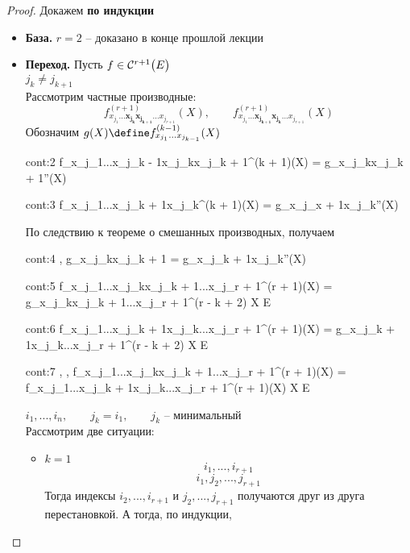 \begin{proof}
	Докажем \textbf{по индукции}
	\begin{itemize}
		\item \textbf{База.} $ r = 2 $ -- доказано в конце прошлой лекции
		\item \textbf{Переход.}
		Пусть $ f \in \Cont[r + 1]{E} $ \\
		$ j_k \ne j_{k + 1} $ \\
		Рассмотрим частные производные:
		$$ f_{x_{j_1}...\bm{x_{j_k}x_{j_{k + 1}}}...x_{j_{r + 1}}}^{(r + 1)}(X), \qquad f_{x_{j_1}...\bm{x_{j_{k + 1}}x_{j_k}}...x_{j_{r + 1}}}^{(r + 1)}(X) $$
		Обозначим $ g(X) \define f_{x_{j_1}...x_{j_{k - 1}}}^{(k - 1)}(X) $
		\begin{equ}{cont:2}
			f_{x_{j_1}...x_{j_{k - 1}}x_{j_k}x_{j_{k + 1}}}^{(k + 1)}(X) = g_{x_{j_k}x_{j_{k + 1}}}''(X)
		\end{equ}
		\begin{equ}{cont:3}
			f_{x_{j_1}...x_{j_{k + 1}}x_{j_k}}^{(k + 1)}(X) = g_{x_{j_{x + 1}}x_{j_k}}''(X)
		\end{equ}
		По следствию к теореме о смешанных производных, получаем
		\begin{equ}{cont:4}
			,  \implies  g_{x_{j_k}x_{j_{k + 1}}} = g_{x_{j_{k + 1}}x_{j_k}}''(X)
		\end{equ}
		\begin{equ}{cont:5}
			 \implies f_{x_{j_1}...x_{j_k}x_{j_{k + 1}}...x_{j_{r + 1}}}^{(r + 1)}(X) = g_{x_{j_k}x_{j_{k + 1}}...x_{j_{r + 1}}}^{(r - k + 2)} \quad \forall X \in E
		\end{equ}
		\begin{equ}{cont:6}
			 \implies f_{x_{j_1}...x_{j_{k + 1}}x_{j_k}...x_{j_{r + 1}}}^{(r + 1)}(X) = g_{x_{j_{k + 1}}x_{j_k}...x_{j_{r + 1}}}^{(r - k + 2)} \quad \forall X \in E
		\end{equ}
		\begin{equ}{cont:7}
			, ,  \implies f_{x_{j_1}...x_{j_k}x_{j_{k + 1}}...x_{j_{r + 1}}}^{(r + 1)}(X) = f_{x_{j_1}...x_{j_{k + 1}}x_{j_k}...x_{j_{r + 1}}}^{(r + 1)}(X) \quad \forall X \in E
		\end{equ}
		$ i_1, ..., i_n, \qquad j_k = i_1, \qquad j_k $ -- минимальный \\
		Рассмотрим две ситуации:
		\begin{itemize}
			\item $ k = 1 $
			$$ i_1, ..., i_{r + 1} $$
			$$ i_1, j_2, ..., j_{r + 1} $$
			Тогда индексы $ i_2, ..., i_{r + 1} $ и $ j_2, ..., j_{r + 1} $ получаются друг из друга перестановкой. А тогда, по индукции,

\end{itemize}
\end{itemize}
\end{proof}
